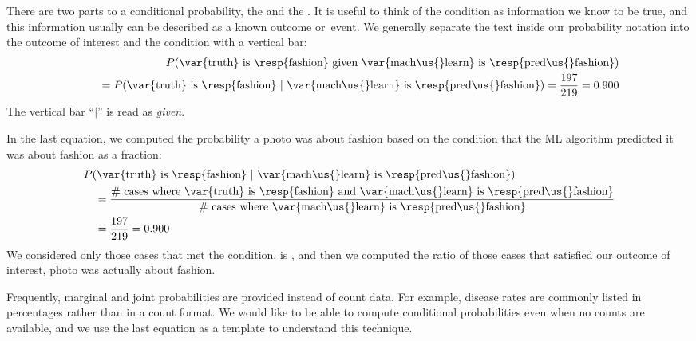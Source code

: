There are two parts to a conditional probability,
the  and the .
It is useful to think of the condition as information we know
to be true, and this information usually can be described as
a known outcome or~event.
We generally separate the text inside our probability notation
into the outcome of interest and the condition with a
vertical bar:
\begin{align*}
&& P(\text{\var{truth} is \resp{fashion} given
    \var{mach\us{}learn} is \resp{pred\us{}fashion}}) \\
&& \quad = P(\text{\var{truth} is \resp{fashion}\ }|
    \text{\ \var{mach\us{}learn} is \resp{pred\us{}fashion}})
  = \frac{\fashYY{}}{\fashYA{}}
  = 0.900
\end{align*}
The vertical bar ``$|$'' is read as \emph{given}.

\D{\newpage}

In the last equation, we computed the probability a photo
was about fashion based on the condition that the ML algorithm
predicted it was about fashion as a fraction:
\begin{align*}
& P(\text{\var{truth} is \resp{fashion}\ }|
    \text{\ \var{mach\us{}learn} is \resp{pred\us{}fashion}}) \\
  &\quad = \frac{\text{\# cases where \var{truth} is \resp{fashion}
       and \var{mach\us{}learn} is \resp{pred\us{}fashion}}}
     {\text{\# cases where \var{mach\us{}learn} is \resp{pred\us{}fashion}}} \\
  &\quad = \frac{\fashYY{}}{\fashYA{}}
      = 0.900
\end{align*}
We considered only those cases that met the condition,
 is , and then
we computed the ratio of those cases that satisfied our
outcome of interest, photo was actually about fashion.

Frequently, marginal and joint probabilities are provided
instead of count data.
For example, disease rates are commonly listed in percentages
rather than in a count format.
We would like to be able to compute conditional probabilities
even when no counts are available, and we use the last equation
as a template to understand this technique.

